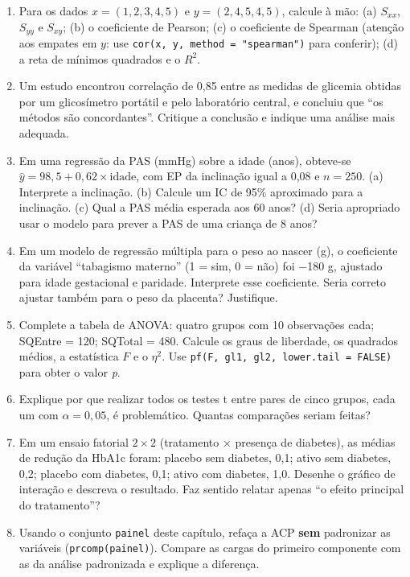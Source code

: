 \documentclass[
]{book}
\begin{document}
\begin{enumerate}
\def\labelenumi{\arabic{enumi}.}
\item
  Para os dados \(x = (1, 2, 3, 4, 5)\) e \(y = (2, 4, 5, 4, 5)\), calcule à mão: (a) \(S_{xx}\), \(S_{yy}\) e \(S_{xy}\); (b) o coeficiente de Pearson; (c) o coeficiente de Spearman (atenção aos empates em \(y\): use \texttt{cor(x,\ y,\ method\ =\ "spearman")} para conferir); (d) a reta de mínimos quadrados e o \(R^2\).
\item
  Um estudo encontrou correlação de 0,85 entre as medidas de glicemia obtidas por um glicosímetro portátil e pelo laboratório central, e concluiu que ``os métodos são concordantes''. Critique a conclusão e indique uma análise mais adequada.
\item
  Em uma regressão da PAS (mmHg) sobre a idade (anos), obteve-se \(\hat{y} = 98{,}5 + 0{,}62 \times \text{idade}\), com EP da inclinação igual a 0,08 e \(n = 250\). (a) Interprete a inclinação. (b) Calcule um IC de 95\% aproximado para a inclinação. (c) Qual a PAS média esperada aos 60 anos? (d) Seria apropriado usar o modelo para prever a PAS de uma criança de 8 anos?
\item
  Em um modelo de regressão múltipla para o peso ao nascer (g), o coeficiente da variável ``tabagismo materno'' (1 = sim, 0 = não) foi −180 g, ajustado para idade gestacional e paridade. Interprete esse coeficiente. Seria correto ajustar também para o peso da placenta? Justifique.
\item
  Complete a tabela de ANOVA: quatro grupos com 10 observações cada; SQEntre = 120; SQTotal = 480. Calcule os graus de liberdade, os quadrados médios, a estatística \(F\) e o \(\eta^2\). Use \texttt{pf(F,\ gl1,\ gl2,\ lower.tail\ =\ FALSE)} para obter o valor \emph{p}.
\item
  Explique por que realizar todos os testes t entre pares de cinco grupos, cada um com \(\alpha = 0{,}05\), é problemático. Quantas comparações seriam feitas?
\item
  Em um ensaio fatorial \(2 \times 2\) (tratamento × presença de diabetes), as médias de redução da HbA1c foram: placebo sem diabetes, 0,1; ativo sem diabetes, 0,2; placebo com diabetes, 0,1; ativo com diabetes, 1,0. Desenhe o gráfico de interação e descreva o resultado. Faz sentido relatar apenas ``o efeito principal do tratamento''?
\item
  Usando o conjunto \texttt{painel} deste capítulo, refaça a ACP \textbf{sem} padronizar as variáveis (\texttt{prcomp(painel)}). Compare as cargas do primeiro componente com as da análise padronizada e explique a diferença.
\end{enumerate}
\end{document}
